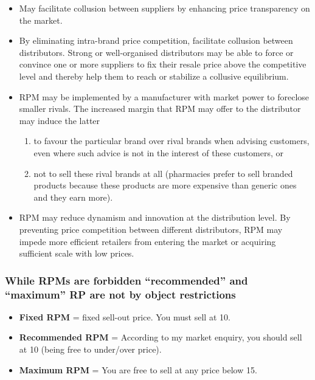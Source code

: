             \begin{itemize}
                \item May facilitate collusion between suppliers by enhancing price transparency on the market.
                \item By eliminating intra-brand price competition, facilitate collusion between distributors. Strong or well-organised distributors may be able to force or convince one or more suppliers to fix their resale price above the competitive level and thereby help them to reach or stabilize a collusive equilibrium. 
                \item RPM may be implemented by a manufacturer with market power to foreclose smaller rivals. The increased margin that RPM may offer to the distributor may induce the latter 
                \begin{enumerate}[label=(\alph*)]
                    \item to favour the particular brand over rival brands when advising customers, even where such advice is not in the interest of these customers, or 
                    \item not to sell these rival brands at all (pharmacies prefer to sell branded products because these products are more expensive than generic ones and they earn more).
                \end{enumerate}
                \item RPM may reduce dynamism and innovation at the distribution level. By preventing price competition between different distributors, RPM may impede more efficient retailers from entering the market or acquiring sufficient scale with low prices.
            \end{itemize}

        \subsubsection{While RPMs are forbidden “recommended” and “maximum” RP are not by object restrictions}

            \begin{itemize}
                \item \textbf{Fixed RPM} = fixed sell-out price. You must sell at 10.
                \item \textbf{Recommended RPM} = According to my market enquiry, you should sell at 10 (being free to under/over price).
                \item \textbf{Maximum RPM} = You are free to sell at any price below 15.
            \end{itemize}

